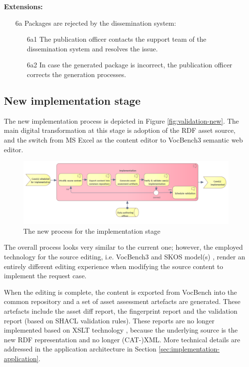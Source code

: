 	\textbf{Extensions:}
	\enlargethispage{5\baselineskip}
	\begin{enumerate}
		\item [6a] Packages are rejected by the dissemination system:
		\begin{enumerate}
			\item [6a1] The publication officer contacts the support team of the dissemination system and resolves the issue. 
			\item [6a2] In case the generated package is incorrect, the publication officer corrects the generation processes.
		\end{enumerate}
	\end{enumerate}

	\subsection{New implementation stage}
	\label{sec:implementation-new}

	The new implementation process is depicted in Figure \ref{fig:validation-new}. The main digital transformation at this stage is adoption of the RDF asset source, and the switch from MS Excel as the content editor to VocBench3 \citep{stellato2017towards,stellatovocbench} semantic web editor. 
	
	\begin{figure}[h]
		\centering
		\includegraphics[width=1.05\textwidth]{images/business/new/Implementation.png}
		\caption{The new process for the implementation stage}
		\label{fig:implementation-new}
	\end{figure} 

	The overall process looks very similar to the current one; however, the employed technology for the source editing, i.e. VocBench3 \citep{stellatovocbench} and SKOS model(s) \citep{skos-spec}, render an entirely different editing experience when modifying the source content to implement the request case.
	
	When the editing is complete, the content is exported from VocBench into the common repository and a set of asset assessment artefacts are generated. These artefacts include the asset diff report, the fingerprint report and the validation report (based on SHACL \citep{shacl-spec} validation rules). These reports are no longer implemented based on XSLT technology \citep{xslt3-Kay}, because the underlying source is the new RDF representation \citep{rdf11} and no longer (CAT-)XML. More technical details are addressed in the application architecture in Section \ref{sec:implementation-application}.
	
